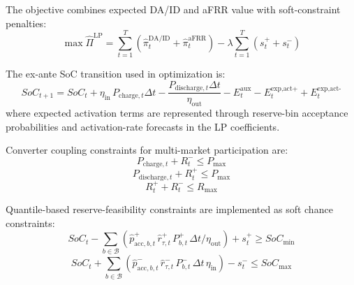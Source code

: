 The objective combines expected DA/ID and aFRR value with soft-constraint penalties:
\begin{equation}\label{eq:dispatch-objective-soft}
    \max \hat{\Pi}^{\mathrm{LP}}
    =
    \sum_{t=1}^{T}\left(\hat{\pi}_{t}^{\mathrm{DA/ID}}+\hat{\pi}_{t}^{\mathrm{aFRR}}\right)
    - \lambda \sum_{t=1}^{T}\left(s_{t}^{+}+s_{t}^{-}\right)
\end{equation}

The ex-ante SoC transition used in optimization is:
\begin{equation}\label{eq:dispatch-soc-dynamics}
    SoC_{t+1}
    =
    SoC_t
    +
    \eta_{\text{in}}\,P_{\text{charge},t}\Delta t
    -
    \frac{P_{\text{discharge},t}\Delta t}{\eta_{\text{out}}}
    -
    E^{\text{aux}}_t
    -
    E^{\text{exp,act+}}_t
    +
    E^{\text{exp,act-}}_t
\end{equation}
where expected activation terms are represented through reserve-bin acceptance probabilities and activation-rate forecasts in the LP coefficients.

Converter coupling constraints for multi-market participation are:
\begin{equation}\label{eq:dispatch-power-coupling-neg}
    P_{\text{charge},t} + R^{-}_t \le P_{\max}
\end{equation}
\begin{equation}\label{eq:dispatch-power-coupling-pos}
    P_{\text{discharge},t} + R^{+}_t \le P_{\max}
\end{equation}
\begin{equation}\label{eq:dispatch-reserve-total}
    R^{+}_t + R^{-}_t \le R_{\max}
\end{equation}

Quantile-based reserve-feasibility constraints are implemented as soft chance constraints:
\begin{equation}\label{eq:dispatch-soft-p90-pos}
    SoC_t - \sum_{b\in\mathcal{B}}
    \left(
    \hat{p}^{+}_{\mathrm{acc},b,t}\,\hat{r}^{+}_{\tau,t}\,P^{+}_{b,t}\,\Delta t/\eta_{\text{out}}
    \right)
    + s_t^{+}
    \ge SoC_{\min}
\end{equation}
\begin{equation}\label{eq:dispatch-soft-p90-neg}
    SoC_t + \sum_{b\in\mathcal{B}}
    \left(
    \hat{p}^{-}_{\mathrm{acc},b,t}\,\hat{r}^{-}_{\tau,t}\,P^{-}_{b,t}\,\Delta t\,\eta_{\text{in}}
    \right)
    - s_t^{-}
    \le SoC_{\max}
\end{equation}


